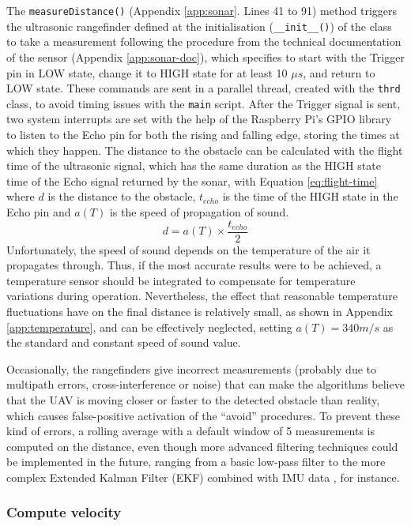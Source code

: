 The \texttt{measureDistance()} (Appendix \ref{app:sonar}. Lines 41 to 91) method triggers the ultrasonic rangefinder defined at the initialisation (\texttt{\_\_init\_\_()}) of the class to take a measurement following the procedure from the technical documentation of the sensor (Appendix \ref{app:sonar-doc}), which specifies to start with the Trigger pin in LOW state, change it to HIGH state for at least 10 $\mu s$, and return to LOW state.
These commands are sent in a parallel thread, created with the \texttt{thrd} class, to avoid timing issues with the \texttt{main} script.
After the Trigger signal is sent, two system interrupts are set with the help of the Raspberry Pi's GPIO library to listen to the Echo pin for both the rising and falling edge, storing the times at which they happen.
The distance to the obstacle can be calculated with the flight time of the ultrasonic signal, which has the same duration as the HIGH state time of the Echo signal returned by the sonar, with Equation \eqref{eq:flight-time} where $d$ is the distance to the obstacle, $t_{echo}$ is the time of the HIGH state in the Echo pin and $a(T)$ is the speed of propagation of sound.
\begin{equation}
	d=a(T)\times \frac{t_{echo}}{2}
	\label{eq:flight-time}
\end{equation}
Unfortunately, the speed of sound depends on the temperature of the air it propagates through.
Thus, if the most accurate results were to be achieved, a temperature sensor should be integrated to compensate for temperature variations during operation.
Nevertheless, the effect that reasonable temperature fluctuations have on the final distance is relatively small, as shown in Appendix \ref{app:temperature}, and can be effectively neglected, setting $a(T)=340 m/s$ as the standard and constant speed of sound value.

Occasionally, the rangefinders give incorrect measurements (probably due to multipath errors, cross-interference or noise) that can make the algorithms believe that the UAV is moving closer or faster to the detected obstacle than reality, which causes false-positive activation of the ``avoid'' procedures.
To prevent these kind of errors, a rolling average with a default window of 5 measurements is computed on the distance, even though more advanced filtering techniques could be implemented in the future, ranging from a basic low-pass filter to the more complex Extended Kalman Filter (EKF) combined with IMU data \cite{sasiadek2000}, for instance. 

\subsubsection{Compute velocity} \label{sec:velocity}

